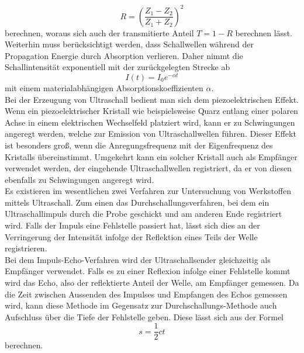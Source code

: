 \begin{equation}
R=(\frac{Z_1-Z_2}{Z_1+Z_2})^2
\end{equation}
berechnen, woraus sich auch der transmitierte Anteil $T=1-R$ berechnen lässt.
Weiterhin muss berücksichtigt werden, dass Schallwellen während der Propagation Energie durch Absorption verlieren. Daher nimmt die Schallintensität exponentiell mit der zurückgelegten Strecke ab
\begin{equation}
I(t)=I_0e^{-\alpha t}
\end{equation}
mit einem materialabhängigen Absorptionskoeffizienten $\alpha$. \\
Bei der Erzeugung von Ultraschall bedient man sich dem piezoelektrischen Effekt. Wenn ein piezoelektrischer Kristall wie beispielsweise Quarz entlang einer polaren Achse in einem elektrischen Wechselfeld platziert wird, kann er zu Schwingungen angeregt werden, welche zur Emission von Ultraschallwellen führen. Dieser Effekt ist besonders groß, wenn die Anregungsfrequenz mit der Eigenfrequenz des Kristalls übereinstimmt. Umgekehrt kann ein solcher Kristall auch als Empfänger verwendet werden, der eingehende Ultraschallwellen registriert, da er von diesen ebenfalls zu Schwingungen angeregt wird. \\
Es existieren im wesentlichen zwei Verfahren zur Untersuchung von Werkstoffen mittels Ultraschall. Zum einen das Durchschallungsverfahren, bei dem ein Ultraschallimpuls durch die Probe geschickt und am anderen Ende registriert wird. Falls der Impuls eine Fehlstelle passiert hat, lässt sich dies an der Verringerung der Intensität infolge der Reflektion eines Teils der Welle registrieren. \\
Bei dem Impuls-Echo-Verfahren wird der Ultraschallsender gleichzeitig als Empfänger verwendet. Falls es zu einer Reflexion infolge einer Fehlstelle kommt wird das Echo, also der reflektierte Anteil der Welle, am Empfänger gemessen. Da die Zeit zwischen Aussenden des Impulses und Empfangen des Echos gemessen wird, kann diese Methode im Gegensatz zur Durchschallungs-Methode auch Aufschluss über die Tiefe der Fehlstelle geben. Diese lässt sich aus der Formel
\begin{equation}
    \label{eq:weg}
s=\frac{1}{2}ct
\end{equation}
berechnen.
